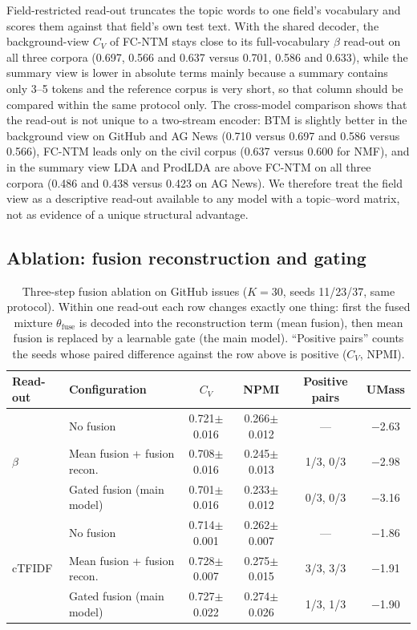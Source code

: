 \documentclass[Journal,letterpaper]{ascelike-new}
\newcommand{\fcntm}{FC-NTM}
\begin{document}
Field-restricted read-out truncates the topic words to one field's vocabulary and scores them
against that field's own test text. With the shared decoder, the background-view $C_V$ of
\fcntm{} stays close to its full-vocabulary $\beta$ read-out on all three corpora (0.697, 0.566
and 0.637 versus 0.701, 0.586 and 0.633), while the summary view is lower in absolute terms mainly
because a summary contains only 3--5 tokens and the reference corpus is very short, so that column
should be compared within the same protocol only. The cross-model comparison shows that the
read-out is not unique to a two-stream encoder: BTM is slightly better in the background view on
GitHub and AG News (0.710 versus 0.697 and 0.586 versus 0.566), \fcntm{} leads only on the civil
corpus (0.637 versus 0.600 for NMF), and in the summary view LDA and ProdLDA are above \fcntm{}
on all three corpora (0.486 and 0.438 versus 0.423 on AG News). We therefore treat the field view
as a descriptive read-out available to any model with a topic--word matrix, not as evidence of a
unique structural advantage.

\subsection{Ablation: fusion reconstruction and gating}

\begin{table}[t]
\centering
\caption{Three-step fusion ablation on GitHub issues ($K=30$, seeds 11/23/37, same protocol). Within one read-out each row changes exactly one thing: first the fused mixture $\theta_{\mathrm{fuse}}$ is decoded into the reconstruction term (mean fusion), then mean fusion is replaced by a learnable gate (the main model). ``Positive pairs'' counts the seeds whose paired difference against the row above is positive ($C_V$, NPMI).}
\label{tab:fusion}
\small
\begin{tabular}{llcccc}
\toprule
Read-out & Configuration & $C_V$ & NPMI & Positive pairs & UMass \\
\midrule
\multirow{3}{*}{$\beta$} & No fusion & 0.721$\pm$0.016 & 0.266$\pm$0.012 & --- & $-$2.63 \\
 & Mean fusion + fusion recon. & 0.708$\pm$0.016 & 0.245$\pm$0.013 & 1/3, 0/3 & $-$2.98 \\
 & Gated fusion (main model) & 0.701$\pm$0.016 & 0.233$\pm$0.012 & 0/3, 0/3 & $-$3.16 \\
\midrule
\multirow{3}{*}{cTFIDF} & No fusion & 0.714$\pm$0.001 & 0.262$\pm$0.007 & --- & $-$1.86 \\
 & Mean fusion + fusion recon. & 0.728$\pm$0.007 & 0.275$\pm$0.015 & 3/3, 3/3 & $-$1.91 \\
 & Gated fusion (main model) & 0.727$\pm$0.022 & 0.274$\pm$0.026 & 1/3, 1/3 & $-$1.90 \\
\bottomrule
\end{tabular}
\end{table}
\end{document}
